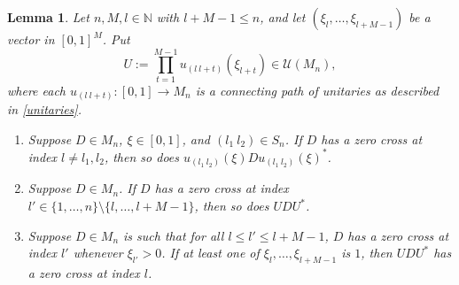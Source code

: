 \documentclass[12pt]{amsart}
\numberwithin{equation}{section}
\newtheorem{lemma}[theorem]{Lemma}
\theoremstyle{definition}
\theoremstyle{remark}
\newcommand{\NN}{\mathbb{N}}
\begin{document}
\begin{lemma}
	\label{untouched crosses}
	Let $n,M,l\in\NN$ with $l+M-1\leq n$, and let $(\xi_{l},\ldots,\xi_{l+M-1})$ be a vector in $[0,1]^{M}$. Put 
	$$
	U:=\prod_{t=1}^{M-1}u_{(l \ l+t)}(\xi_{l+t})\in\mathcal{U}(M_{n}),
	$$
	where each $u_{(l \ l+t)}\colon [0,1]\to M_{n}$ is a connecting path of unitaries as described in \autoref{unitaries}.
	\begin{enumerate}[label=(\alph*)]
		\item Suppose $D\in M_{n}$, $\xi\in [0,1]$, and $(l_{1} \ l_{2})\in S_{n}$. If $D$ has a zero cross at index $l\not=l_{1},l_{2}$, then so does $u_{(l_{1} \ l_{2})}(\xi)Du_{(l_{1} \ l_{2})}(\xi)^{*}$. 
		\item Suppose $D\in M_{n}$. If $D$ has a zero cross at index $l'\in\{1,\ldots,n\}\setminus \{l,\ldots,l+M-1\}$, then so does $UDU^{*}$. 
		\item Suppose $D\in M_{n}$ is such that for all $l\leq l'\leq l+M-1$, $D$ has a zero cross at index $l'$ whenever $\xi_{l'}>0$. If at least one of $\xi_{l},\ldots,\xi_{l+M-1}$ is $1$, then $UDU^{*}$ has a zero cross at index $l$.
	\end{enumerate}
\end{lemma}
\end{document}

